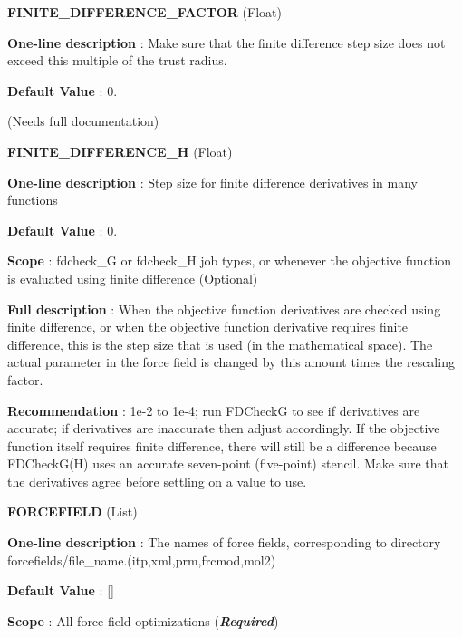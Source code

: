 \begin{DoxyItemize}
\item {\bfseries  F\-I\-N\-I\-T\-E\-\_\-\-D\-I\-F\-F\-E\-R\-E\-N\-C\-E\-\_\-\-F\-A\-C\-T\-O\-R } (Float) \par
{\bfseries  One-\/line description }\-: Make sure that the finite difference step size does not exceed this multiple of the trust radius. \par
{\bfseries  Default Value }\-: 0. \par
(Needs full documentation)\end{DoxyItemize}
\begin{DoxyItemize}
\item {\bfseries  F\-I\-N\-I\-T\-E\-\_\-\-D\-I\-F\-F\-E\-R\-E\-N\-C\-E\-\_\-\-H } (Float) \par
{\bfseries  One-\/line description }\-: Step size for finite difference derivatives in many functions \par
{\bfseries  Default Value }\-: 0. \par
{\bfseries  Scope }\-: fdcheck\-\_\-\-G or fdcheck\-\_\-\-H job types, or whenever the objective function is evaluated using finite difference (Optional) \par
{\bfseries  Full description }\-: When the objective function derivatives are checked using finite difference, or when the objective function derivative requires finite difference, this is the step size that is used (in the mathematical space). The actual parameter in the force field is changed by this amount times the rescaling factor. \par
{\bfseries  Recommendation }\-: 1e-\/2 to 1e-\/4; run F\-D\-Check\-G to see if derivatives are accurate; if derivatives are inaccurate then adjust accordingly. If the objective function itself requires finite difference, there will still be a difference because F\-D\-Check\-G(\-H) uses an accurate seven-\/point (five-\/point) stencil. Make sure that the derivatives agree before settling on a value to use.\end{DoxyItemize}
\begin{DoxyItemize}
\item {\bfseries  F\-O\-R\-C\-E\-F\-I\-E\-L\-D } (List) \par
{\bfseries  One-\/line description }\-: The names of force fields, corresponding to directory forcefields/file\-\_\-name.(itp,xml,prm,frcmod,mol2) \par
{\bfseries  Default Value }\-: \mbox{[}\mbox{]} \par
{\bfseries  Scope }\-: All force field optimizations ({\bfseries {\itshape Required}})\end{DoxyItemize}
